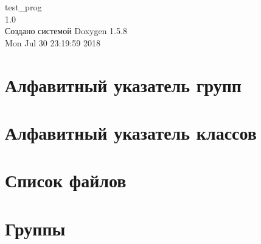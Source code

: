 \documentclass[a4paper]{book}
\begin{document}
\begin{titlepage}
\vspace*{7cm}
\begin{center}
{\Large test\_\-prog \\[1ex]\large 1.0 }\\
\vspace*{1cm}
{\large Создано системой Doxygen 1.5.8}\\
\vspace*{0.5cm}
{\small Mon Jul 30 23:19:59 2018}\\
\end{center}
\end{titlepage}
\clearemptydoublepage
{}
\tableofcontents
\clearemptydoublepage
{}
\chapter{Алфавитный указатель групп}

\chapter{Алфавитный указатель классов}

\chapter{Список файлов}

\chapter{Группы}


























\end{document}

